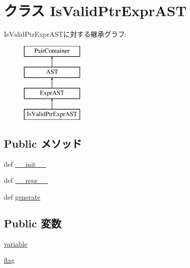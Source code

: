 \hypertarget{classslicc_1_1ast_1_1IsValidPtrExprAST_1_1IsValidPtrExprAST}{
\section{クラス IsValidPtrExprAST}
\label{classslicc_1_1ast_1_1IsValidPtrExprAST_1_1IsValidPtrExprAST}
}
IsValidPtrExprASTに対する継承グラフ:\begin{figure}[H]
\begin{center}
\leavevmode
\includegraphics[height=4cm]{classslicc_1_1ast_1_1IsValidPtrExprAST_1_1IsValidPtrExprAST}
\end{center}
\end{figure}
\subsection*{Public メソッド}
\begin{DoxyCompactItemize}
\item 
def \hyperlink{classslicc_1_1ast_1_1IsValidPtrExprAST_1_1IsValidPtrExprAST_ac775ee34451fdfa742b318538164070e}{\_\-\_\-init\_\-\_\-}
\item 
def \hyperlink{classslicc_1_1ast_1_1IsValidPtrExprAST_1_1IsValidPtrExprAST_ad8b9328939df072e4740cd9a63189744}{\_\-\_\-repr\_\-\_\-}
\item 
def \hyperlink{classslicc_1_1ast_1_1IsValidPtrExprAST_1_1IsValidPtrExprAST_a4555d1cee0dccf3942ea35fe86de2e8e}{generate}
\end{DoxyCompactItemize}
\subsection*{Public 変数}
\begin{DoxyCompactItemize}
\item 
\hyperlink{classslicc_1_1ast_1_1IsValidPtrExprAST_1_1IsValidPtrExprAST_a9cd756653e5b34f63d5cf5c342143cb5}{variable}
\item 
\hyperlink{classslicc_1_1ast_1_1IsValidPtrExprAST_1_1IsValidPtrExprAST_a7847560c748814fd3070e9149a9578bd}{flag}
\end{DoxyCompactItemize}


